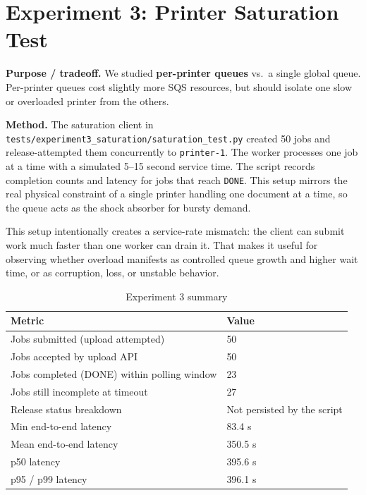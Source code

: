 \documentclass[10pt,letterpaper]{article}
\newcommand{\code}[1]{\texttt{\small #1}}
\begin{document}
\section*{Experiment 3: Printer Saturation Test}
\begin{claimbox}
\textbf{Purpose / tradeoff.} We studied \textbf{per-printer queues} vs.\ a single global queue. Per-printer queues cost slightly more SQS resources, but should isolate one slow or overloaded printer from the others.
\end{claimbox}

\textbf{Method.} The saturation client in \code{tests/experiment3\_saturation/saturation\_test.py} created 50 jobs and release-attempted them concurrently to \code{printer-1}. The worker processes one job at a time with a simulated 5--15 second service time. The script records completion counts and latency for jobs that reach \texttt{DONE}. This setup mirrors the real physical constraint of a single printer handling one document at a time, so the queue acts as the shock absorber for bursty demand.

This setup intentionally creates a service-rate mismatch: the client can submit work much faster than one worker can drain it. That makes it useful for observing whether overload manifests as controlled queue growth and higher wait time, or as corruption, loss, or unstable behavior.

\begin{table}[H]
\centering
\caption{Experiment 3 summary}
\begin{tabularx}{\linewidth}{@{}lX@{}}
\toprule
\textbf{Metric} & \textbf{Value} \\
\midrule
Jobs submitted (upload attempted) & 50 \\
Jobs accepted by upload API & 50 \\
Jobs completed (DONE) within polling window & 23 \\
Jobs still incomplete at timeout & 27 \\
Release status breakdown & Not persisted by the script \\
Min end-to-end latency & 83.4 s \\
Mean end-to-end latency & 350.5 s \\
p50 latency & 395.6 s \\
p95 / p99 latency & 396.1 s \\
\bottomrule
\end{tabularx}
\end{table}
\end{document}
